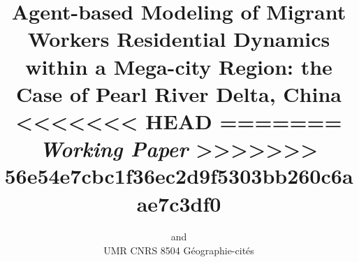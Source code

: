 

\def \draft {1}



\title{Agent-based Modeling of Migrant Workers Residential Dynamics within a Mega-city Region: the Case of Pearl River Delta, China
<<<<<<< HEAD
=======
\bigskip\\
\textit{Working Paper}
>>>>>>> 56e54e7cbc1f36ec2d9f5303bb260c6aae7c3df0
}
\author{ and \\
UMR CNRS 8504 Géographie-cités
}
\date{}




\maketitle

\justify


